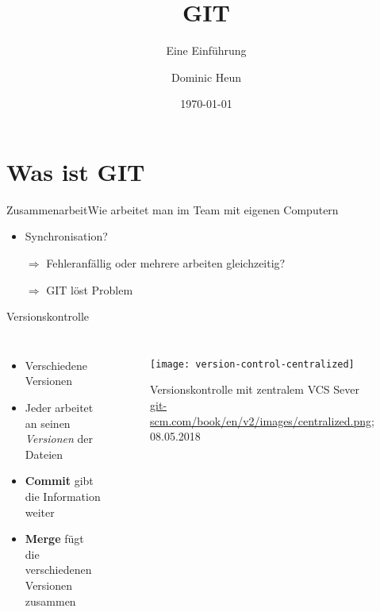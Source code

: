 \documentclass[xcolor=dvipsnames]{beamer}
\title{GIT}
\subtitle{Eine Einführung}
\author[Dominic]{Dominic Heun}
\institute{AES Ettlingen - TGJ2/2}
\date{\today}
\begin{document}


  \begin{frame}[plain]
    \titlepage
  \end{frame}

  \section{Was ist GIT}

  \begin{frame}{Zusammenarbeit}{Wie arbeitet man im Team mit eigenen Computern}
    \begin{itemize}[<+->]
      \item Synchronisation?
      \item[$\Rightarrow$] Fehleranfällig oder mehrere arbeiten gleichzeitig?
      \item[$\Rightarrow$] GIT löst Problem
    \end{itemize}
  \end{frame}

  \begin{frame}{Versionskontrolle}
      \begin{columns}

          \begin{itemize}[<+->]
            \item Verschiedene Versionen
            \item Jeder arbeitet an seinen \textit{Versionen} der Dateien
            \item \textbf{Commit} gibt die Information weiter
            \item \textbf{Merge} fügt die verschiedenen Versionen zusammen
          \end{itemize}

          \begin{figure}
            \texttt{[image: version-control-centralized]}
            \caption{
              Versionskontrolle mit zentralem VCS Sever
              \tiny{
                \url{git-scm.com/book/en/v2/images/centralized.png}; 08.05.2018
              }
            }
          \end{figure}
      \end{columns}
  \end{frame}
\end{document}
